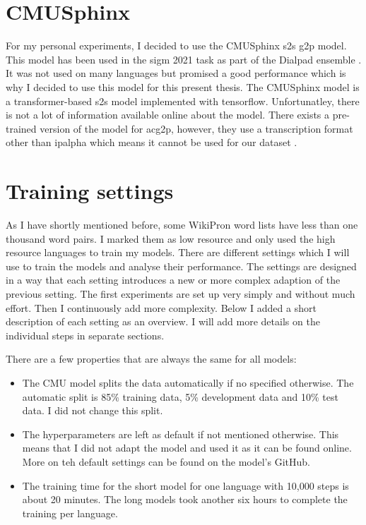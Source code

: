 \section{CMUSphinx}
\label{sec:cmu}
For my personal experiments, I decided to use the CMUSphinx \ac{s2s} \ac{g2p} model. This model has been used in the \ac{sigm} 2021 task as part of the Dialpad ensemble \citep{gautam.2021}. It was not used on many languages but promised a good performance which is why I decided to use this model for this present thesis. The CMUSphinx model is a transformer-based \ac{s2s} model implemented with tensorflow. Unfortunatley, there is not a lot of information available online about the model. There exists a pre-trained version of the model for ac{g2p}, however, they use a transcription format other than \ac{ipalpha} which means it cannot be used for our dataset \citep{GitHub.03.02.2022}. 

\section{Training settings}
\label{sec:train-settings}
As I have shortly mentioned before, some WikiPron word lists have less than one thousand word pairs. I marked them as low resource and only used the high resource languages to train my models. There are different settings which I will use to train the models and analyse their performance. The settings are designed in a way that each setting introduces a new or more complex adaption of the previous setting. The first experiments are set up very simply and without much effort. Then I continuously add more complexity. Below I added a short description of each setting as an overview. I will add more details on the individual steps in separate sections. 

There are a few properties that are always the same for all models:
\begin{itemize}
\item The CMU model splits the data automatically if no specified otherwise. The automatic split is 85\% training data, 5\% development data and 10\% test data. I did not change this split.
\item The hyperparameters are left as default if not mentioned otherwise. This means that I did not adapt the model and used it as it can be found online. More on teh default settings can be found on the model's GitHub.
\item The training time for the short model for one language with 10,000 steps is about 20 minutes. The long models took another six hours to complete the training per language.  
\end{itemize}

